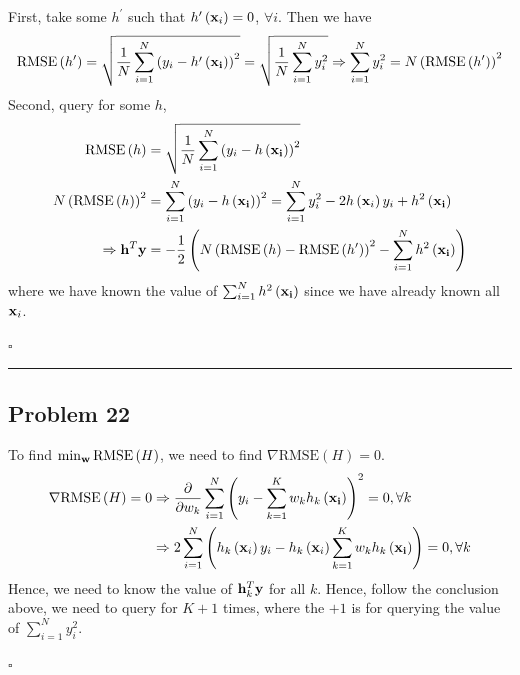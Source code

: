 \documentclass[12pt]{article}
\newcommand*{\QEDB}{\hfill\ensuremath{\square}}
\newcommand{\ParTh}[1]{\left(#1\right)}
\newcommand{\BF}[1]{{\bf#1}}
\newcommand{\horrule}[1]{\rule{\linewidth}{#1}}
\begin{document}
First, take some $h^\prime$ such that $h^\prime\ParTh{\BF{x}_i}=0$, $\forall i$. Then we have
\begin{align}
\text{RMSE}\ParTh{h^\prime}=\sqrt{\dfrac{1}{N}\sum_{i=1}^{N}\ParTh{y_i-h^\prime\ParTh{\BF{x_i}}}^2}=\sqrt{\dfrac{1}{N}\sum_{i=1}^{N}y^2_i}\Rightarrow\sum_{i=1}^{N}y^2_i=N\ParTh{\text{RMSE}\ParTh{h^\prime}}^2
\end{align}
Second, query for some $h$,
\begin{align}
\text{RMSE}\ParTh{h}&=\sqrt{\dfrac{1}{N}\sum_{i=1}^{N}\ParTh{y_i-h\ParTh{\BF{x_i}}}^2}\\
N\ParTh{\text{RMSE}\ParTh{h}}^2&=\sum_{i=1}^{N}\ParTh{y_i-h\ParTh{\BF{x_i}}}^2=\sum_{i=1}^{N}y^2_i-2h\ParTh{\BF{x}_i}y_i+h^2\ParTh{\BF{x_i}}\\
\Rightarrow\BF{h}^T\BF{y}&=-\dfrac{1}{2}\ParTh{N\ParTh{\text{RMSE}\ParTh{h}-\text{RMSE}\ParTh{h^\prime}}^2-\sum_{i=1}^{N}h^2\ParTh{\BF{x_i}}}
\end{align}
where we have known the value of $\sum_{i=1}^{N}h^2\ParTh{\BF{x_i}}$ since we have already known all $\BF{x}_i$.

\QEDB

\horrule{0.5pt}

\subsection*{Problem 22}

To find $\min_{\BF{w}}\text{RMSE}\ParTh{H}$, we need to find $\nabla\text{RMSE}\ParTh{H}=0$.
\begin{align}
\nabla\text{RMSE}\ParTh{H}=0&\Rightarrow\dfrac{\partial}{\partial w_k}\sum_{i=1}^{N}\ParTh{y_i-\sum_{k=1}^{K}w_kh_k\ParTh{\BF{x_i}}}^2=0, \forall k\\
&\Rightarrow2\sum_{i=1}^{N}\ParTh{h_k\ParTh{\BF{x}_i}y_i-h_k\ParTh{\BF{x}_i}\sum_{k=1}^{K}w_kh_k\ParTh{\BF{x_i}}}=0, \forall k
\end{align}
Hence, we need to know the value of $\BF{h}^T_k\BF{y}$ for all $k$. Hence, follow the conclusion above, we need to query for $K+1$ times, where the $+1$ is for querying the value of $\sum_{i=1}^{N}y^2_i$.

\QEDB
\end{document}
